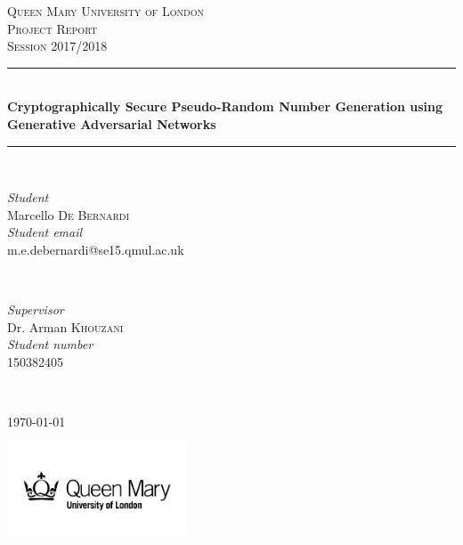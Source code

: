 \documentclass[12pt, titlepage]{report}
\theoremstyle{definition}
\begin{document}
\begin{titlepage}
	\newcommand{\HRule}{\rule{\linewidth}{0.5mm}}
	\center
	

	\textsc{\Large Queen Mary University of London}\\[1.5cm]
	\textsc{\Large Project Report}\\[0.5cm]
	\textsc{\large Session 2017/2018}\\[0.cm]


	\HRule\\[0.4cm]

	{\huge\bfseries Cryptographically Secure Pseudo-Random Number Generation using Generative Adversarial Networks}\\[0.1cm]

	\HRule\\[1.5cm]


	\begin{minipage}{0.4\textwidth}
		\begin{flushleft}
			\large
			\textit{Student}\\
			Marcello \textsc{De Bernardi}\\[0.4cm] %
      \textit{Student email}\\
      m.e.debernardi@se15.qmul.ac.uk
		\end{flushleft}
	\end{minipage}
	~
	\begin{minipage}{0.4\textwidth}
		\begin{flushright}
			\large
			\textit{Supervisor}\\
			Dr. Arman \textsc{Khouzani}\\[0.4cm] %
      \textit{Student number}\\
      150382405
		\end{flushright}
	\end{minipage}
  	~


	\vfill\vfill\vfill
	{\large\today}


	\vfill\vfill
	\includegraphics[width=0.4\textwidth]{img/qmul.png}\\[1cm]
	\vfill
\end{titlepage}
\end{document}
